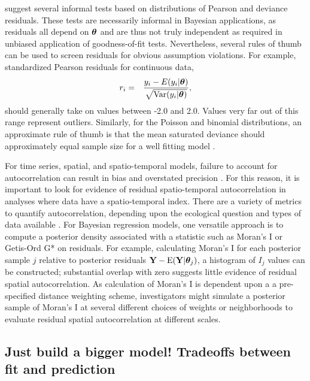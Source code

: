 \documentclass[12pt,english]{article}
\begin{document}
\begin{spacing}{1.9}
\citet{LunnEtAl2013} suggest several informal tests based on distributions of Pearson and deviance residuals.  These tests are necessarily informal in Bayesian applications, as residuals all depend on $\boldsymbol{\theta}$ and are thus not truly independent as required in unbiased application of goodness-of-fit tests.  Nevertheless, several rules of thumb can be used to screen residuals for obvious assumption violations.  For example, standardized Pearson residuals for continuous data,
\begin{eqnarray*}
  r_i & = & \frac{y_i - E(y_i|\boldsymbol{\theta})}{\sqrt{\textrm{Var}(y_i | \boldsymbol{\theta})}},
\end{eqnarray*}
should generally take on values between -2.0 and 2.0.  Values very far out of this range represent outliers.
Similarly, for the Poisson and binomial distributions, an approximate rule of thumb is that the mean saturated deviance should approximately equal sample size for a well fitting model \citep{LunnEtAl2013}.

For time series, spatial, and spatio-temporal models, failure to account for autocorrelation can result in bias and overstated precision \citep{LichsteinEtAl2002}.  For this reason, it is important to look for evidence of residual spatio-temporal autocorrelation in analyses where data have a spatio-temporal index.  There are a variety of metrics to quantify autocorrelation, depending upon the ecological question and types of data available \cite[e.g.][]{PerryEtAl2002}.  For Bayesian regression models, one versatile approach is to compute a posterior density associated with a statistic such as Moran's I \citep{Moran1950} or Getis-Ord G* \citep{GetisOrd1992} on residuals.  For example, calculating Moran's I for each posterior sample $j$ relative to posterior residuals ${\bf Y} - \textrm{E}({\bf Y} | \boldsymbol{\theta}_j)$, a histogram of $I_j$ values can be constructed; substantial overlap with zero suggests little evidence of residual spatial autocorrelation.  As calculation of Moran's I is dependent upon a a pre-specified distance weighting scheme, investigators might simulate a posterior sample of Moran's I at several different choices of weights or neighborhoods to evaluate residual spatial autocorrelation at different scales.  

\subsection{Just build a bigger model!  Tradeoffs between fit and prediction}


\end{spacing}
\end{document}
